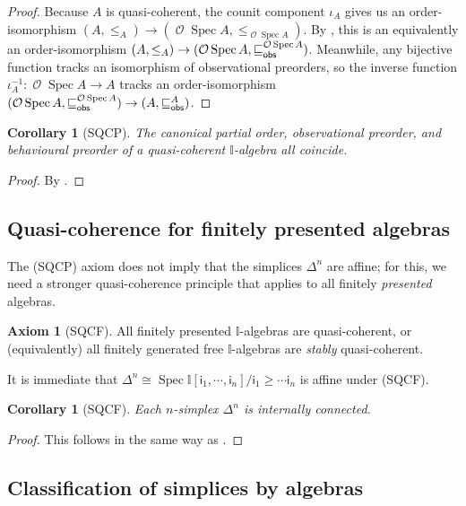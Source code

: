 \documentclass[a4paper,12pt]{amsart}
\newtheorem{corollary}[theorem]{Corollary}
\theoremstyle{definition}
\newtheorem*{axiom}{Axiom}
\newcommand{\mc}[1]{\mathcal{#1}}
\newcommand{\mbb}[1]{\mathbb{#1}}
\newcommand{\I}{\mbb I}
\newcommand{\ms}[1]{\mathsf{#1}}
\newcommand{\spec}{\operatorname{Spec}}
\newcommand{\opens}{\operatorname{\mc{O}}} %
\begin{document}
\begin{proof}
  Because $A$ is quasi-coherent, the counit component $\iota_A$ gives us an order-isomorphism ${(A,\le_A)}\to (\opens\spec{A},\le_{\opens\spec{A}})$. By , this is an equivalently an order-isomorphism ${(A,\le_A)}\to {(\opens\spec{A},\obsle[\opens\spec{A}])}$. Meanwhile, any bijective function tracks an isomorphism of observational preorders, so the inverse function $\iota_A^{-1}\colon \opens\spec{A}\to A$ tracks an order-isomorphism  ${(\opens\spec{A},\obsle[\opens\spec{A}])}\to {(A,\obsle[A])}$. 
\end{proof}

\begin{corollary}[SQCP]
  The canonical partial order, observational preorder, and behavioural preorder of a quasi-coherent $\I$-algebra all coincide.
\end{corollary}

\begin{proof}
  By .
\end{proof}


\subsection{Quasi-coherence for finitely presented algebras}

The (SQCP) axiom does not imply that the simplices $\Delta^n$ are affine; for this, we need a stronger quasi-coherence principle that applies to all finitely \emph{presented} algebras.


\begin{axiom}[SQCF]
  All finitely presented $\I$-algebras are quasi-coherent, or (equivalently) all finitely generated free $\I$-algebras are \emph{stably} quasi-coherent.
\end{axiom}

It is immediate that $\Delta^n\cong \spec\I[\ms{i}_1,\cdots,\ms{i}_n]/\ms{i}_1\geq \cdots \ms{i}_n$ is affine under (SQCF).

\begin{corollary}[SQCF]
  Each $n$-simplex $\Delta^n$ is internally connected.
\end{corollary}

\begin{proof}
  This follows in the same way as .
\end{proof}

\subsection{Classification of simplices by algebras}
\end{document}
